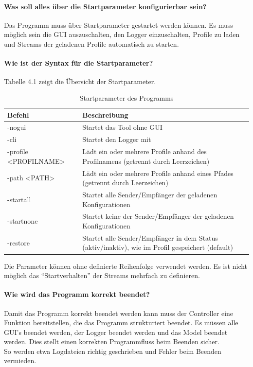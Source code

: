   \paragraph{Was soll alles über die Startparameter konfigurierbar sein?}
  Das Programm muss über Startparameter gestartet werden können. Es muss möglich sein die GUI auszuschalten, den Logger einzuschalten, Profile zu laden und
  Streams der geladenen Profile automatisch zu starten.
  \paragraph{Wie ist der Syntax für die Startparameter?}
  Tabelle 4.1  zeigt die Übersicht der Startparameter.
  \begin{table}[H]
    \label{paramter}
    \caption{Startparameter des Programms}
    \center
    \begin{tabular}{|p{5cm}|p{10cm}|}
    \hline
    \textbf{Befehl} & \textbf{Beschreibung}\\
    \hline
    -nogui & Startet das Tool ohne GUI\\
    \hline
    -cli & Startet den Logger mit\\
    \hline
    -profile <PROFILNAME> & Lädt ein oder mehrere Profile anhand des
    Profilnamens (getrennt durch Leerzeichen)\\
    \hline
    -path <PATH> & Lädt ein oder mehrere Profile anhand eines Pfades (getrennt durch
    Leerzeichen)\\
    \hline
    -startall & Startet alle Sender/Empfänger der geladenen Konfigurationen\\
    \hline
    -startnone & Startet keine der Sender/Empfänger der geladenen Konfigurationen\\
    \hline
    -restore & Startet alle Sender/Empfänger in dem Status (aktiv/inaktiv), wie im
    Profil gespeichert (default)\\
    \hline
    \end{tabular}
  \end{table}
  Die Parameter können ohne definierte Reihenfolge verwendet werden. Es ist nicht möglich das "`Startverhalten"' der Streams mehrfach zu definieren.
  \paragraph{Wie wird das Programm korrekt beendet?}
  Damit das Programm korrekt beendet werden kann muss der Controller eine Funktion bereitstellen, die das Programm strukturiert beendet.
  Es müssen alle GUI's beendet werden, der Logger beendet werden und das Model beendet werden. Dies stellt einen korrekten Programmfluss beim Beenden sicher.\\
  So werden etwa Logdateien richtig geschrieben und Fehler beim Beenden vermieden.

